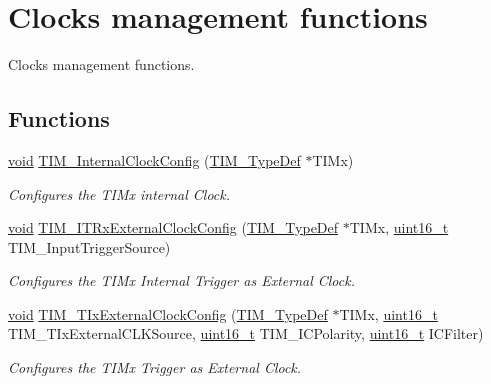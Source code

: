 \hypertarget{group___t_i_m___group6}{\section{Clocks management functions}
\label{group___t_i_m___group6}
}


Clocks management functions.  


\subsection*{Functions}
\begin{DoxyCompactItemize}
\item 
\hyperlink{group___n_a_m_e_ga18028b8badbf1ea7e704ccac3c488e82}{void} \hyperlink{group___t_i_m___group6_ga2394f0221709c0659874f9a4184cf86e}{T\-I\-M\-\_\-\-Internal\-Clock\-Config} (\hyperlink{struct_t_i_m___type_def}{T\-I\-M\-\_\-\-Type\-Def} $\ast$T\-I\-Mx)
\begin{DoxyCompactList}\small\item\em Configures the T\-I\-Mx internal Clock. \end{DoxyCompactList}\item 
\hyperlink{group___n_a_m_e_ga18028b8badbf1ea7e704ccac3c488e82}{void} \hyperlink{group___t_i_m___group6_gabef227d21d9e121e6a4ec5ab6223f5a9}{T\-I\-M\-\_\-\-I\-T\-Rx\-External\-Clock\-Config} (\hyperlink{struct_t_i_m___type_def}{T\-I\-M\-\_\-\-Type\-Def} $\ast$T\-I\-Mx, \hyperlink{stdint_8h_a273cf69d639a59973b6019625df33e30}{uint16\-\_\-t} T\-I\-M\-\_\-\-Input\-Trigger\-Source)
\begin{DoxyCompactList}\small\item\em Configures the T\-I\-Mx Internal Trigger as External Clock. \end{DoxyCompactList}\item 
\hyperlink{group___n_a_m_e_ga18028b8badbf1ea7e704ccac3c488e82}{void} \hyperlink{group___t_i_m___group6_gaf460e7d9c9969044e364130e209937fc}{T\-I\-M\-\_\-\-T\-Ix\-External\-Clock\-Config} (\hyperlink{struct_t_i_m___type_def}{T\-I\-M\-\_\-\-Type\-Def} $\ast$T\-I\-Mx, \hyperlink{stdint_8h_a273cf69d639a59973b6019625df33e30}{uint16\-\_\-t} T\-I\-M\-\_\-\-T\-Ix\-External\-C\-L\-K\-Source, \hyperlink{stdint_8h_a273cf69d639a59973b6019625df33e30}{uint16\-\_\-t} T\-I\-M\-\_\-\-I\-C\-Polarity, \hyperlink{stdint_8h_a273cf69d639a59973b6019625df33e30}{uint16\-\_\-t} I\-C\-Filter)
\begin{DoxyCompactList}\small\item\em Configures the T\-I\-Mx Trigger as External Clock. \end{DoxyCompactList}\item 

\end{DoxyCompactItemize}
